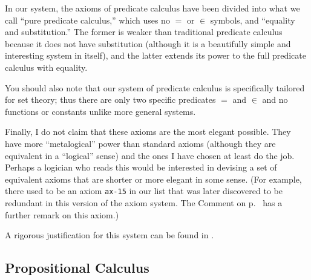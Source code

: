 In our system, the axioms of predicate calculus have been divided into what we
call ``pure predicate calculus,'' which uses no $=$ or $\in$ symbols, and
``equality and substitution.''  The former is weaker than traditional
predicate calculus because it does not have substitution (although it is a
beautifully simple and interesting system in itself), and the latter extends
its power to the full predicate calculus with equality.

You should also note that our system of predicate calculus is specifically
tailored for set theory; thus there are only two specific predicates $=$ and
$\in$ and no functions
or constants unlike more general systems.

Finally, I do not claim that these axioms are the most elegant possible.
They have more ``metalogical'' power than standard
axioms (although they are equivalent in a ``logical'' sense) and the
ones I have chosen at least do the job.  Perhaps a logician who reads
this would be interested in devising a set of equivalent axioms that are
shorter or more elegant in some sense.
(For example, there used to be an axiom \texttt{ax-15} in our list that
was later discovered to be redundant in this version of the axiom
system.  The Comment on p.~\pageref{nodd} has a further remark on this axiom.)

A rigorous justification for this system can be found in
\cite{Megill}.

\newbox\mlinebox
\newbox\mtrialbox
\newbox\startprefix  %
\newbox\contprefix  %
\def\startm{  %
  \setbox\mlinebox=\hbox{\unhcopy\startprefix}
}
\def\m#1{  %
  \setbox\mtrialbox=\hbox{\unhcopy\mlinebox $\,#1$}
  \ifdim\wd\mtrialbox>\hsize
    \box\mlinebox
    \setbox\mlinebox=\hbox{\unhcopy\contprefix $\,#1$}
  \else
    \setbox\mlinebox=\hbox{\unhbox\mtrialbox}
  \fi
}
\def\endm{  %
  \box\mlinebox
}



\subsection{Propositional Calculus}\label{propcalc}

